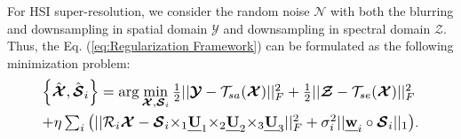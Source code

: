 \documentclass[twocolumn]{svjour3}          %
\begin{document}
    For HSI super-resolution, we consider the random noise ${\boldsymbol{\mathcal{N}}}$ with both the blurring and downsampling in spatial domain ${\boldsymbol{\mathcal{Y}}}$ and downsampling in spectral domain ${\boldsymbol{\mathcal{Z}}}$. Thus, the Eq. (\ref{eq:Regularization Framework}) can be formulated as the following minimization problem:
    \begin{equation}\label{eq:SR-WLRTR}
    \begin{aligned}
    \setlength{\abovedisplayskip}{2pt}
    \setlength{\belowdisplayskip}{2pt}
    &\resizebox{0.87\hsize}{!}{$ \left\{ {\hat{\boldsymbol{\mathcal{X}}},{{\hat{\boldsymbol{\mathcal{S}}}}_i}} \right\} = \arg \mathop {\min }\limits_{{\boldsymbol{\mathcal{X}}},{{\boldsymbol{\mathcal{S}}}_i}} \frac{1}{2}||{\boldsymbol{\mathcal{Y}}} - {\mathcal{T}_{sa}}({\boldsymbol{\mathcal{X}}})||_F^2 + \frac{1}{2}||{\boldsymbol{\mathcal{Z}}} - {\mathcal{T}_{se}}({\boldsymbol{\mathcal{X}}})||_F^2$} \\
    & \resizebox{0.87\hsize}{!}{$ +  \eta \sum\nolimits_i {\left( {||{{\mathcal{R}}_i}{\boldsymbol{\mathcal{X}}} - {{\boldsymbol{\mathcal{S}}}_i}{ \times _1}{\textbf{\emph{U}}_1}{ \times _2}{\textbf{\emph{U}}_2}{ \times _3}{\textbf{\emph{U}}_3}||_F^2 + \sigma _i^2||{\textbf{\emph{w}}_i} \circ {{\boldsymbol{\mathcal{S}}}_i}|{|_1}} \right)}$}.
    \end{aligned}
    \end{equation}
\end{document}
